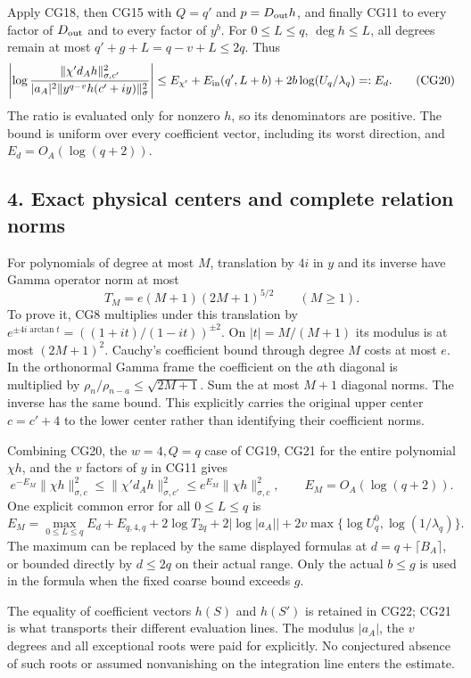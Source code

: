 \documentclass[11pt]{article}
\begin{document}
Apply CG18, then CG15 with \(Q=q'\) and \(p=D_{\rm out}h\), and finally CG11 to every factor of \(D_{\rm out}\) and to every factor of \(y^b\). For \(0\le L\le q\), \(\deg h\le L\), all degrees remain at most \(q'+g+L=q-v+L\le2q\). Thus \[
\left|\log\frac{\|\chi' d_Ah\|_{\sigma,c'}^2}
 {|a_A|^2\|y^{q-v}h(c'+iy)\|_\sigma^2}\right|
\le E_{\chi'}+E_{\rm in}(q',L+b)
+2b\log(U_q/\lambda_q)=:E_d.
\tag{CG20}
\] The ratio is evaluated only for nonzero \(h\), so its denominators are positive. The bound is uniform over every coefficient vector, including its worst direction, and \(E_d=O_A(\log(q+2))\).

\subsection{4. Exact physical centers and complete relation norms}\label{exact-physical-centers-and-complete-relation-norms}

For polynomials of degree at most \(M\), translation by \(4i\) in \(y\) and its inverse have Gamma operator norm at most \[
T_M=e(M+1)(2M+1)^{5/2}\qquad(M\ge1).
\tag{CG21}
\] To prove it, CG8 multiplies under this translation by \(e^{\pm4i\arctan t}=((1+it)/(1-it))^{\pm2}\). On \(|t|=M/(M+1)\) its modulus is at most \((2M+1)^2\). Cauchy's coefficient bound through degree \(M\) costs at most \(e\). In the orthonormal Gamma frame the coefficient on the \(a\)th diagonal is multiplied by \(\rho_n/\rho_{n-a}\le\sqrt{2M+1}\). Sum the at most \(M+1\) diagonal norms. The inverse has the same bound. This explicitly carries the original upper center \(c=c'+4\) to the lower center rather than identifying their coefficient norms.

Combining CG20, the \(w=4,Q=q\) case of CG19, CG21 for the entire polynomial \(\chi h\), and the \(v\) factors of \(y\) in CG11 gives \[
\boxed{e^{-E_M}\|\chi h\|_{\sigma,c}^2
\le\|\chi'd_Ah\|_{\sigma,c'}^2
\le e^{E_M}\|\chi h\|_{\sigma,c}^2,\qquad E_M=O_A(\log(q+2)).}
\tag{CG22}
\] One explicit common error for all \(0\le L\le q\) is \[
E_M=\max_{0\le L\le q}E_d
+E_{q,4,q}+2\log T_{2q}+2|\log|a_A||
+2v\max\{\log U_q^0,\log(1/\lambda_q)\}.
\] The maximum can be replaced by the same displayed formulas at \(d=q+\lceil B_A\rceil\), or bounded directly by \(d\le2q\) on their actual range. Only the actual \(b\le g\) is used in the formula when the fixed coarse bound exceeds \(g\).

The equality of coefficient vectors \(h(S)\) and \(h(S')\) is retained in CG22; CG21 is what transports their different evaluation lines. The modulus \(|a_A|\), the \(v\) degrees and all exceptional roots were paid for explicitly. No conjectured absence of such roots or assumed nonvanishing on the integration line enters the estimate.
\end{document}
